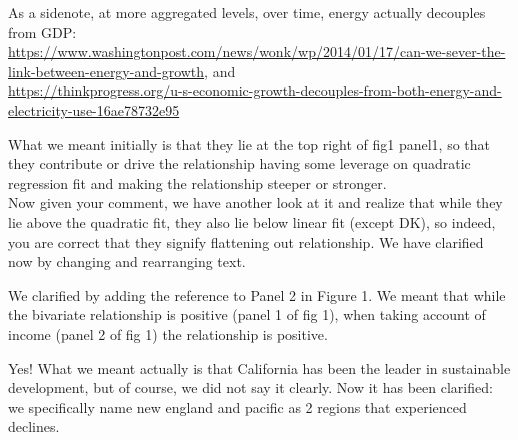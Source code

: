 As a sidenote, at more aggregated levels, over time, energy  actually decouples from GDP:\\
{\footnotesize
\url{https://www.washingtonpost.com/news/wonk/wp/2014/01/17/can-we-sever-the-link-between-energy-and-growth}, and\\
\url{https://thinkprogress.org/u-s-economic-growth-decouples-from-both-energy-and-electricity-use-16ae78732e95}
}


What we meant initially is that they lie at the top right of fig1
panel1, so that they contribute or drive the relationship having some leverage
on quadratic regression fit and making the relationship steeper or stronger. 
\\

Now given your comment, we have another look at it and realize that while they
lie above the quadratic fit, they also lie below linear fit (except DK), so
indeed, you are correct that they signify flattening out relationship.
We have clarified now by changing and rearranging text.



We clarified by adding the reference to Panel 2 in Figure 1. We meant that while
 the bivariate relationship is positive (panel 1 of fig 1),  when taking
 account of income (panel 2 of fig 1) the relationship is positive.


Yes! What we meant actually is that California has been the leader in
sustainable development, but of course, we did
not say it clearly. Now it has been clarified: we specifically name new england
and pacific as 2 regions that experienced declines.


